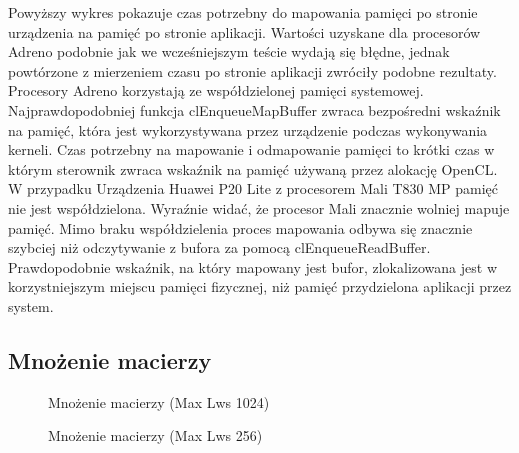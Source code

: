 Powyższy wykres pokazuje czas potrzebny do mapowania pamięci po stronie urządzenia na pamięć po stronie aplikacji. Wartości uzyskane dla procesorów Adreno podobnie jak we wcześniejszym teście wydają się błędne, jednak powtórzone z mierzeniem czasu po stronie aplikacji zwróciły podobne rezultaty. Procesory Adreno korzystają ze współdzielonej pamięci systemowej. Najprawdopodobniej  funkcja clEnqueueMapBuffer zwraca bezpośredni wskaźnik na pamięć, która jest wykorzystywana przez urządzenie podczas wykonywania kerneli. Czas potrzebny na mapowanie i odmapowanie pamięci to krótki czas w którym sterownik zwraca wskaźnik na pamięć używaną przez alokację OpenCL. W przypadku Urządzenia Huawei P20 Lite z procesorem Mali T830 MP pamięć nie jest współdzielona. Wyraźnie widać, że procesor Mali znacznie wolniej mapuje pamięć. Mimo braku współdzielenia proces mapowania odbywa się znacznie szybciej niż odczytywanie z bufora za pomocą clEnqueueReadBuffer. Prawdopodobnie wskaźnik, na który mapowany jest bufor, zlokalizowana jest w korzystniejszym miejscu pamięci fizycznej, niż pamięć przydzielona aplikacji przez system.

\subsection[Mnożenie macierzy]{Mnożenie macierzy}
\begin{figure}[H]
\caption{Mnożenie macierzy (Max Lws 1024)}
\end{figure}

\begin{figure}[H]
\caption{Mnożenie macierzy (Max Lws 256)}
\end{figure}

